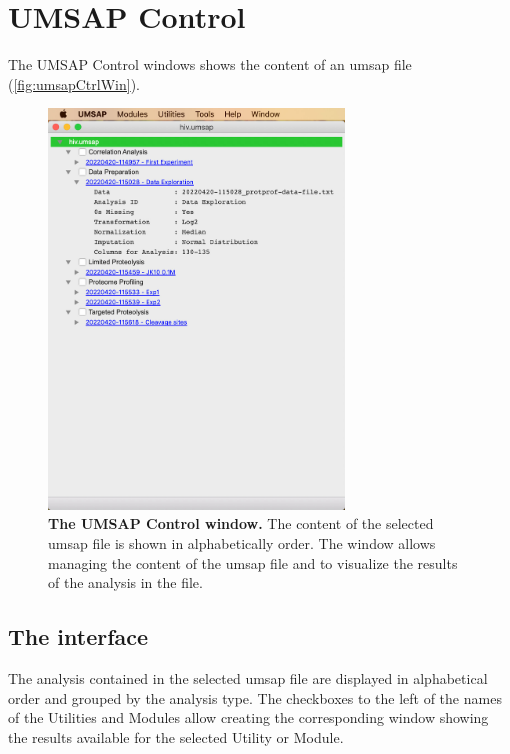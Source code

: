 \chapter{UMSAP Control}
\label{chap:umsapCtrl}

The UMSAP Control windows shows the content of an umsap file (\autoref{fig:umsapCtrlWin}).

\begin{figure}[h]
    \centering
    \includegraphics[width=0.7\textwidth]{./IMAGES/UMSAPCtrl/UMSAPCtrl.jpg}
    \caption[The UMSAP Control window]{\textbf{The UMSAP Control window.} The content
    of the selected umsap file is shown in alphabetically order. The window allows
    managing the content of the umsap file and to visualize the results of the analysis
    in the file.} 
    \label{fig:umsapCtrlWin}
    \vspace{-5pt}
\end{figure}

\section{The interface}

The analysis contained in the selected umsap file are displayed in alphabetical
order and grouped by the analysis type. The checkboxes to the left of the names of
the Utilities and Modules allow creating the corresponding window showing the results
available for the selected Utility or Module.

